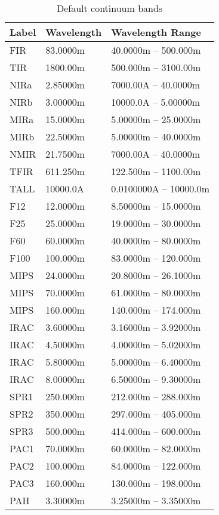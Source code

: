 \begin{table}
\centering
\caption{\label{tab:continuum_bands}Default continuum bands}
\begin{tabular}{lll}
\hline
Label& Wavelength&Wavelength Range\\
\hline
 FIR  & 83.0000m & 40.0000m -- 500.000m\\ 
 TIR  & 1800.00m & 500.000m -- 3100.00m\\ 
 NIRa & 2.85000m & 7000.00A -- 40.0000m\\ 
 NIRb & 3.00000m & 10000.0A -- 5.00000m\\ 
 MIRa & 15.0000m & 5.00000m -- 25.0000m\\ 
 MIRb & 22.5000m & 5.00000m -- 40.0000m\\ 
 NMIR & 21.7500m & 7000.00A -- 40.0000m\\ 
 TFIR & 611.250m & 122.500m -- 1100.00m\\ 
 TALL & 10000.0A & 0.0100000A -- 10000.0m\\ 
 F12  & 12.0000m & 8.50000m -- 15.0000m\\ 
 F25  & 25.0000m & 19.0000m -- 30.0000m\\ 
 F60  & 60.0000m & 40.0000m -- 80.0000m\\ 
 F100 & 100.000m & 83.0000m -- 120.000m\\ 
 MIPS & 24.0000m & 20.8000m -- 26.1000m\\ 
 MIPS & 70.0000m & 61.0000m -- 80.0000m\\ 
 MIPS & 160.000m & 140.000m -- 174.000m\\ 
 IRAC & 3.60000m & 3.16000m -- 3.92000m\\ 
 IRAC & 4.50000m & 4.00000m -- 5.02000m\\ 
 IRAC & 5.80000m & 5.00000m -- 6.40000m\\ 
 IRAC & 8.00000m & 6.50000m -- 9.30000m\\ 
 SPR1 & 250.000m & 212.000m -- 288.000m\\ 
 SPR2 & 350.000m & 297.000m -- 405.000m\\ 
 SPR3 & 500.000m & 414.000m -- 600.000m\\ 
 PAC1 & 70.0000m & 60.0000m -- 82.0000m\\ 
 PAC2 & 100.000m & 84.0000m -- 122.000m\\ 
 PAC3 & 160.000m & 130.000m -- 198.000m\\ 
 PAH  & 3.30000m & 3.25000m -- 3.35000m\\ 

\end{tabular}
\end{table}
